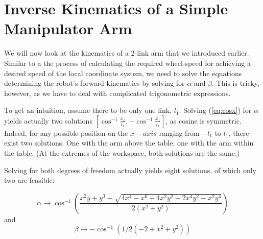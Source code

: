 \section{Inverse Kinematics of a Simple Manipulator Arm}
We will now look at the kinematics of a 2-link arm that we introduced earlier. Similar to a the process of calculating the required wheel-speed for achieving a desired speed of the local coordinate system, we need to solve the equations determining the robot's forward kinematics by solving for $ \alpha$ and $ \beta$. This is tricky, however, as we have to deal with complicated trigonometric expressions.

To get an intuition, assume there to be only one link, $l_1$.  Solving (\ref{eq:cosx}) for $\alpha$ yields actually two solutions $\left[\cos^{-1}\frac{x_1}{l_1},-\cos^{-1}\frac{x_1}{l_1}\right]$, as cosine is symmetric. Indeed, for any possible position on the $x-axis$ ranging from $-l_1$ to $l_1$, there exist two solutions. One with the arm above the table, one with the arm within the table. (At the extremes of the workspace, both solutions are the same.)


Solving for both degrees of freedom actually yields eight solutions, of which only two are feasible:

\begin{equation}
\alpha \rightarrow \cos^{-1}\left(\frac{x^2 y + y^3 - \sqrt{4 x^4 - x^6 + 4 x^2 y^2 - 2 x^4 y^2 - x^2 y^4}}{2 (x^2 + y^2)}\right)
\end{equation}
and
\begin{equation}
\beta \rightarrow -\cos^{-1}\left(1/2(-2+x^2+y^2)\right)
\end{equation}

